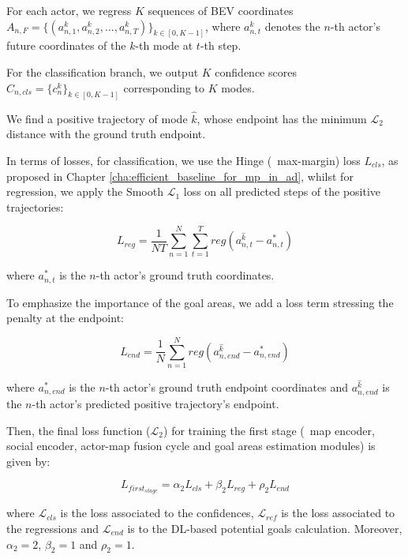 For each actor, we regress $K$ sequences of \ac{BEV} coordinates 
$A_{n,F}=\{(a_{n,1}^k,a_{n,2}^k,...,a_{n,T}^k)\}_{k \in [0,K-1]}$,
where $a_{n,t}^k$ denotes the $n$-th actor's future coordinates of the $k$-th mode at $t$-th step. 

For the classification branch, we output $K$ confidence scores $C_{n,cls} = \{c_n^k\}_{k \in [0,K-1]}$ corresponding to $K$ modes.

We find a positive trajectory of mode $\hat{k}$, whose endpoint has the minimum $\mathcal{L}_2$ distance with the ground truth endpoint.

In terms of losses, for classification, we use the Hinge (\aka \ max-margin) loss $L_{cls}$, as proposed in Chapter \ref{cha:efficient_baseline_for_mp_in_ad}, whilst for regression, we apply the Smooth $\mathcal{L}_1$ loss on all predicted steps of the positive trajectories:

\begin{equation}
	L_{reg}=\frac{1}{NT}\sum_{n=1}^N\sum_{t=1}^T{reg(a_{n,t}^{\hat{k}}-a^{*}_{n,t})}
\end{equation}

where $a^{*}_{n,t}$ is the $n$-th actor's ground truth coordinates.

To emphasize the importance of the goal areas, we add a loss term stressing the penalty at the endpoint:

\begin{equation}
	L_{end}=\frac{1}{N}\sum_{n=1}^N{reg(a_{n,end}^{\hat{k}}-a^{*}_{n,end})}
\end{equation}

where $a^{*}_{n,end}$ is the $n$-th actor's ground truth endpoint coordinates and $a_{n,end}^{\hat{k}}$ is the $n$-th actor's predicted positive trajectory's endpoint.

Then, the final loss function ($\mathcal{L}_2$) for training the first stage (\ie \ map encoder, social encoder, actor-map fusion cycle and goal areas estimation modules) is given by:

\begin{equation}
	L_{first_{stage}} = \alpha_2 L_{cls} + \beta_2 L_{reg} + \rho_2 L_{end}
\end{equation}

where $\mathcal{L}_{cls}$ is the loss associated to the confidences, $\mathcal{L}_{ref}$ is the loss associated to the regressions and $\mathcal{L}_{end}$ is to the \ac{DL}-based potential goals calculation. Moreover, $\alpha_2=2$, $\beta_2=1$ and $\rho_2=1$.

